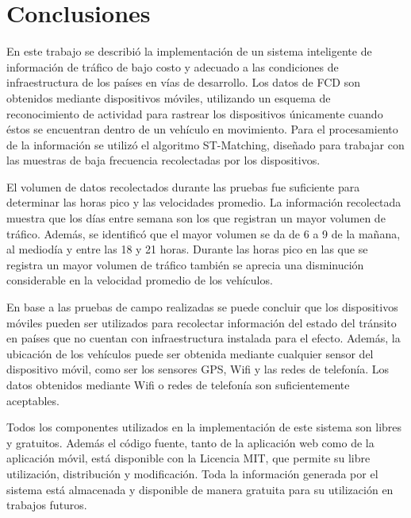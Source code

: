 \section{Conclusiones}
\label{sec:conclusiones}

En este trabajo se describió la implementación de un sistema inteligente de información de tráfico de bajo costo y adecuado a las condiciones de infraestructura de los países en vías de desarrollo. Los datos de FCD son obtenidos mediante dispositivos móviles, utilizando un esquema de reconocimiento de actividad para rastrear los dispositivos únicamente cuando éstos se encuentran dentro de un vehículo en movimiento. Para el procesamiento de la información se utilizó el algoritmo ST-Matching, diseñado para trabajar con las muestras de baja frecuencia recolectadas por los dispositivos.

El volumen de datos recolectados durante las pruebas fue suficiente para determinar las horas pico y las velocidades promedio. La información recolectada muestra que los días entre semana son los que registran un mayor volumen de tráfico. Además, se identificó que el mayor volumen se da de 6 a 9 de la mañana, al mediodía y entre las 18 y 21 horas. Durante las horas pico en las que se registra un mayor volumen de tráfico también se aprecia una disminución considerable en la velocidad promedio de los vehículos.

En base a las pruebas de campo realizadas se puede concluir que los dispositivos móviles pueden ser utilizados para recolectar información del estado del tránsito en países que no cuentan con infraestructura instalada para el efecto. Además, la ubicación de los vehículos puede ser obtenida mediante cualquier sensor del dispositivo móvil, como ser los sensores GPS, Wifi y las redes de telefonía. Los datos obtenidos mediante Wifi o redes de telefonía son suficientemente aceptables.

Todos los componentes utilizados en la implementación de este sistema son libres y gratuitos. Además el código fuente, tanto de la aplicación web como de la aplicación móvil, está disponible con la Licencia MIT, que permite su libre utilización, distribución y modificación. Toda la información generada por el sistema está almacenada y disponible de manera gratuita para su utilización en trabajos futuros.